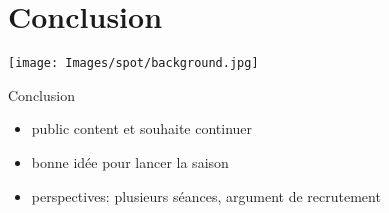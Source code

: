 \documentclass[10pt,a4paper]{beamer}
\begin{document}
\section{Conclusion}
{
{
   \texttt{[image: Images/spot/background.jpg]}
}

\begin{frame}{Conclusion}
\begin{itemize}
\item public content et souhaite continuer
\item bonne idée pour lancer la saison
\item perspectives: plusieurs séances, argument de recrutement 
\end{itemize}
\end{frame}
}
\end{document}
